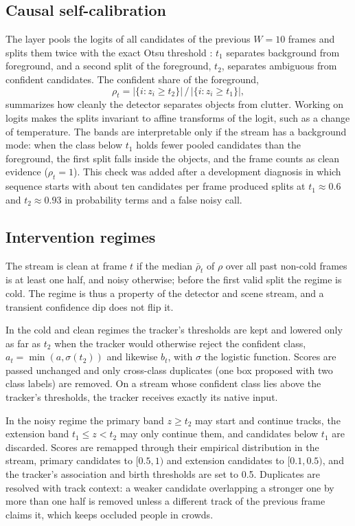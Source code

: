 \documentclass[pdflatex,sn-mathphys-num,iicol]{sn-jnl}
\begin{document}
\subsection{Causal self-calibration}
The layer pools the logits of all candidates of the previous $W=10$ frames and splits them twice with the exact Otsu threshold \cite{otsu1979}: $t_1$ separates background from foreground, and a second split of the foreground, $t_2$, separates ambiguous from confident candidates. The confident share of the foreground,
\begin{equation}
\rho_t = \left|\{i: z_i \ge t_2\}\right| \,/\, \left|\{i: z_i \ge t_1\}\right|,
\label{eq:rho}
\end{equation}
summarizes how cleanly the detector separates objects from clutter. Working on logits makes the splits invariant to affine transforms of the logit, such as a change of temperature. The bands are interpretable only if the stream has a background mode: when the class below $t_1$ holds fewer pooled candidates than the foreground, the first split falls inside the objects, and the frame counts as clean evidence ($\rho_t=1$). This check was added after a development diagnosis in which sequence starts with about ten candidates per frame produced splits at $t_1\approx0.6$ and $t_2\approx0.93$ in probability terms and a false noisy call.

\subsection{Intervention regimes}
The stream is clean at frame $t$ if the median $\bar\rho_t$ of $\rho$ over all past non-cold frames is at least one half, and noisy otherwise; before the first valid split the regime is cold. The regime is thus a property of the detector and scene stream, and a transient confidence dip does not flip it.

In the cold and clean regimes the tracker's thresholds are kept and lowered only as far as $t_2$ when the tracker would otherwise reject the confident class, $a_t=\min(a,\sigma(t_2))$ and likewise $b_t$, with $\sigma$ the logistic function. Scores are passed unchanged and only cross-class duplicates (one box proposed with two class labels) are removed. On a stream whose confident class lies above the tracker's thresholds, the tracker receives exactly its native input.

In the noisy regime the primary band $z\ge t_2$ may start and continue tracks, the extension band $t_1\le z<t_2$ may only continue them, and candidates below $t_1$ are discarded. Scores are remapped through their empirical distribution in the stream, primary candidates to $[0.5,1)$ and extension candidates to $[0.1,0.5)$, and the tracker's association and birth thresholds are set to 0.5. Duplicates are resolved with track context: a weaker candidate overlapping a stronger one by more than one half is removed unless a different track of the previous frame claims it, which keeps occluded people in crowds.
\end{document}
